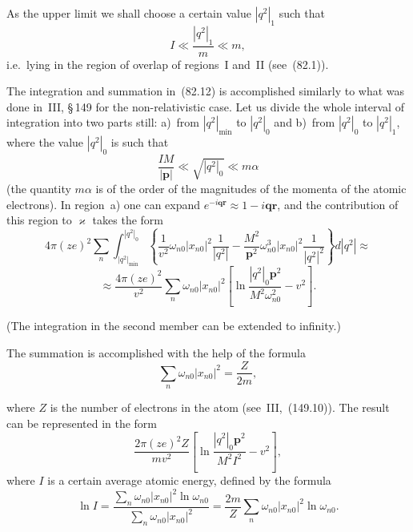 As the upper limit we shall choose a certain value $|q^2|_1$ such that
\begin{equation}
I \ll \frac{|q^2|_1}{m} \ll m,
\tag{82.14}
\end{equation}
i.e.\ lying in the region of overlap of regions~I and~II (see~(82.1)).

The integration and summation in~(82.12) is accomplished similarly to what was done in~III, \S\,149 for the non-relativistic case. Let us divide the whole interval of integration into two parts still: a)~from $|q^2|_\text{min}$ to $|q^2|_0$ and b)~from $|q^2|_0$ to $|q^2|_1$, where the value $|q^2|_0$ is such that
\begin{equation}
\frac{IM}{|\mathbf{p}|} \ll \sqrt{|q^2|_0} \ll m\alpha
\tag{82.15}
\end{equation}
(the quantity $m\alpha$ is of the order of the magnitudes of the momenta of the atomic electrons). In region~a) one can expand $e^{-i\mathbf{qr}} \approx 1 - i\mathbf{qr}$, and the contribution of this region to $\varkappa$ takes the form
\[
4\pi(ze)^2\sum_n\int_{|q^2|_\text{min}}^{|q^2|_0}\left\{\frac{1}{v^2}\omega_{n0}|x_{n0}|^2\frac{1}{|q^2|}-\frac{M^2}{\mathbf{p}^2}\omega_{n0}^3|x_{n0}|^2\frac{1}{|q^2|^2}\right\}d|q^2| \approx
\]
\[
\approx \frac{4\pi(ze)^2}{v^2}\sum_n\omega_{n0}|x_{n0}|^2\left[\ln\frac{|q^2|_0\mathbf{p}^2}{M^2\omega_{n0}^2} - v^2\right].
\]

(The integration in the second member can be extended to infinity.)

The summation is accomplished with the help of the formula
\begin{equation}
\sum_n\omega_{n0}|x_{n0}|^2 = \frac{Z}{2m},
\tag{82.16}
\end{equation}

where $Z$ is the number of electrons in the atom (see~III,~(149.10)). The result can be represented in the form
\begin{equation}
\frac{2\pi(ze)^2 Z}{mv^2}\left[\ln\frac{|q^2|_0\mathbf{p}^2}{M^2 I^2} - v^2\right],
\tag{82.17}
\end{equation}
where $I$ is a certain average atomic energy, defined by the formula
\begin{equation}
\ln I = \frac{\sum_n\omega_{n0}|x_{n0}|^2\ln\omega_{n0}}{\sum_n\omega_{n0}|x_{n0}|^2} = \frac{2m}{Z}\sum_n\omega_{n0}|x_{n0}|^2\ln\omega_{n0}.
\tag{82.18}
\end{equation}

